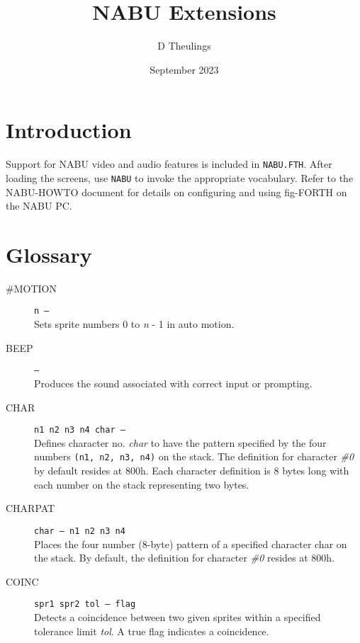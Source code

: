\documentclass{article}
\title{NABU Extensions}
\author{D Theulings}
\date{September 2023}
\begin{document}
	\maketitle
	\begin{multicols}{2}[]
		\setlength{\parskip}{.5em}
		\setlength\parindent{0pt}

		\section{Introduction}
		Support for NABU video and audio features\footnotemark{} is included
		in \verb|NABU.FTH|. After loading the screens, use \verb|NABU| to invoke
		the appropriate vocabulary. Refer to the NABU-HOWTO document for details 
		on configuring and using fig-FORTH on the NABU PC.

		\section{Glossary}
		\begin{description}
			\item[\#MOTION]\texttt{n --- }\\
				Sets sprite numbers 0 to \textit{n} - 1 in auto motion.

			\item[BEEP]\texttt{--- }\\
				Produces the sound associated with correct input or prompting.

			\item[CHAR]\texttt{n1 n2 n3 n4 char --- }\\
				Defines character no. \textit{char} to have the pattern specified by
				the four numbers \verb|(n1, n2, n3, n4)| on the stack. The definition
				for character \textit{\#0} by default resides at 800h. Each character
				definition is 8 bytes long with each number on the stack representing
				two bytes.

			\item[CHARPAT]\texttt{char --- n1 n2 n3 n4 }\\
				Places the four number (8-byte) pattern of a specified character char
				on the stack. By default, the definition for character \textit{\#0}
				resides at 800h.

			\item[COINC]\texttt{spr1 spr2 tol --- flag }\\
				Detects a coincidence between two given sprites within a specified
				tolerance limit \textit{tol}. A true flag indicates a coincidence.


\end{description}
\end{multicols}
\end{document}
